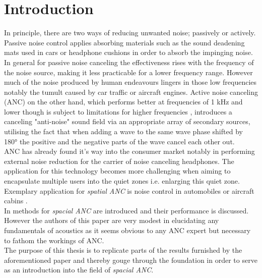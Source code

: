 \chapter{Introduction}
\label{chap:introduction}

In principle, there are two ways of reducing unwanted noise; passively or actively. Passive noise control applies absorbing materials such as the sound deadening mats used in cars or headphone cushions in order to absorb the impinging noise. In general for passive noise canceling the effectiveness rises with the frequency of the noise source, making it less practicable for a lower frequency range.\cite{Chen2017} However much of the noise produced by human endeavours lingers in those low frequencies notably the tumult caused by car traffic or aircraft engines. Active noise canceling (ANC) on the other hand, which performs better at frequencies of 1 kHz and lower though is subject to limitations for higher frequencies \cite{Kaymak2006}, introduces a canceling "anti-noise" sound field via an appropriate array of secondary sources\cite{Kuo1999}, utilising the fact that when adding a wave to the same wave phase shifted by 180° the positive and the negative parts of the wave cancel each other out.\\

ANC has already found it's way into the consumer market notably in performing external noise reduction for the carrier of noise canceling headphones. The application for this technology becomes more challenging when aiming to encapsulate multiple users into the quiet zones i.e. enlarging this quiet zone. Exemplary application for \textit{spatial ANC} is noise control in automobiles or aircraft cabins \cite{Zhang2019}.\\

In \cite{Zhang2019} methods for \textit{spacial ANC} are introduced and their performance is discussed. However the authors of this paper are very modest in elucidating any fundamentals of acoustics as it seems obvious to any ANC expert but necessary to fathom the workings of ANC.\\ 
The purpose of this thesis is to replicate parts of the results furnished by the aforementioned paper and thereby gouge through the foundation in order to serve as an introduction into the field of \textit{spacial ANC}.\\

